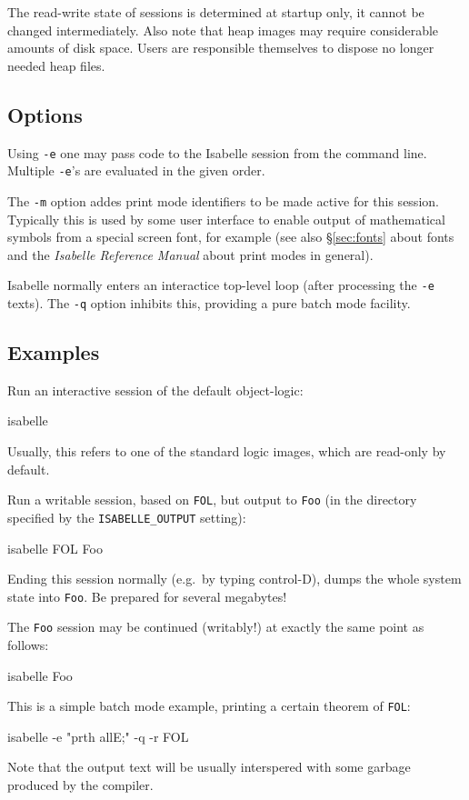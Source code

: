 The read-write state of sessions is determined at startup only, it
cannot be changed intermediately. Also note that heap images may
require considerable amounts of disk space. Users are responsible
themselves to dispose no longer needed heap files.


\subsection*{Options}

Using \texttt{-e} one may pass {\ML} code to the Isabelle session from
the command line. Multiple \texttt{-e}'s are evaluated in the given
order.

The \texttt{-m} option addes print mode identifiers to be made active
for this session. Typically this is used by some user interface to
enable output of mathematical symbols from a special screen font, for
example (see also \S\ref{sec:fonts} about fonts and the \emph{Isabelle
  Reference Manual} about print modes in general).

Isabelle normally enters an interactice {\ML} top-level loop (after
processing the \texttt{-e} texts). The \texttt{-q} option inhibits
this, providing a pure batch mode facility.


\subsection*{Examples}

Run an interactive session of the default object-logic:
\begin{ttbox}
isabelle
\end{ttbox}
Usually, this refers to one of the standard logic images, which are
read-only by default.

Run a writable session, based on \texttt{FOL}, but output to
\texttt{Foo} (in the directory specified by the
\texttt{ISABELLE_OUTPUT} setting):
\begin{ttbox}
isabelle FOL Foo
\end{ttbox}
Ending this session normally (e.g.\ by typing control-D), dumps the
whole {\ML} system state into \texttt{Foo}. Be prepared for several
megabytes!

The \texttt{Foo} session may be continued (writably!) at exactly the
same point as follows:
\begin{ttbox}
isabelle Foo
\end{ttbox}

\medskip This is a simple batch mode example, printing a certain
theorem of \texttt{FOL}:
\begin{ttbox}
isabelle -e "prth allE;" -q -r FOL
\end{ttbox}
Note that the output text will be usually interspered with some
garbage produced by the {\ML} compiler.

